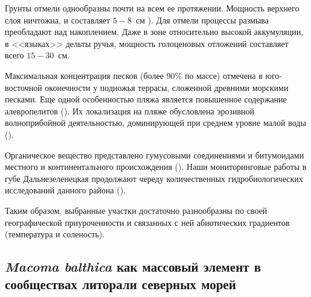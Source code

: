 Грунты отмели однообразны почти на всем ее протяжении. 
Мощность верхнего слоя ничтожна, и составляет $5 - 8$~см \cite{Prigorovskiy_1948}). 
Для отмели процессы размыва преобладают над накоплением. 
Даже в зоне относительно высокой аккумуляции, в <<языках>> дельты ручья, мощность голоценовых отложений составляет всего $15 - 30$~см.

Максимальная концентрация песков (более $90$\% по массе) отмечена в юго-восточной оконечности у подножья террасы, сложенной древними морскими песками. Еще одной особенностью пляжа является повышенное содержание алевропелитов (\cite{Pavlova_1976}). 
Их локализация на пляже обусловлена эрозивной волноприбойной деятельностью, доминирующей при среднем уровне малой воды (\cite{Alexeev_1976}).

Органическое вещество представлено гумусовыми соединениями и битумоидами местного и континентального происхождения (\cite{Gurevich_Yakovleva_1976}).
Наши мониторинговые работы в губе Дальнезеленецкая продолжают череду количественных гидробиологических исследований данного района (\cite{Prigorovskiy_1948, Matveeva_et_al_1955, Streltsov_et_al_1974, Agarova_et_al_1976, Zhukov_1984}).


Таким образом, выбранные участки достаточно разнообразны по своей географической приуроченности и связанных с ней абиотических градиентов (температура и соленость).

		\subsection{{\it Macoma balthica} как массовый элемент в сообществах литорали северных морей}








